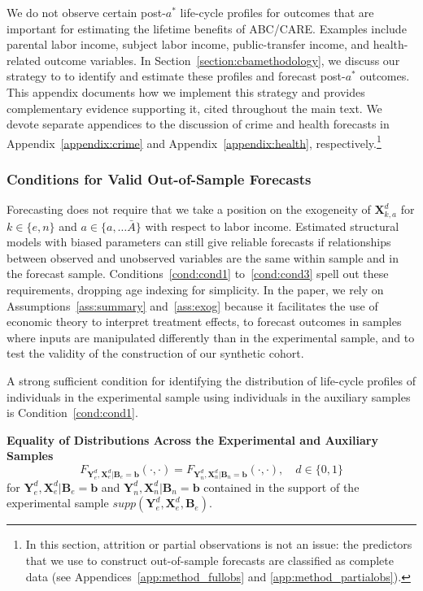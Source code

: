 \noindent We do not observe certain post-$a^*$ life-cycle profiles for outcomes that are important for estimating the lifetime benefits of ABC/CARE. Examples include parental labor income, subject labor income, public-transfer income, and health-related outcome variables. In Section~\ref{section:cbamethodology}, we discuss our strategy to to identify and estimate these profiles and forecast post-$a^\ast$ outcomes. This appendix documents how we implement this strategy and provides complementary evidence supporting it, cited throughout the main text. We devote separate appendices to the discussion of crime and health forecasts in Appendix~\ref{appendix:crime} and Appendix~\ref{appendix:health}, respectively.\footnote{In this section, attrition or partial observations is not an issue: the predictors that we use to construct out-of-sample forecasts are classified as complete data (see Appendices~\ref{app:method_fullobs} and \ref{app:method_partialobs}).}

\subsubsection{Conditions for Valid Out-of-Sample Forecasts}

Forecasting does not require that we take a position on the exogeneity of $\bm{X}^d_{k,a}$ for $k \in \{e,n\}$ and $a \in \{ a, \ldots \bar{A} \}$ with respect to labor income. Estimated structural models with biased parameters can still give reliable forecasts if relationships between observed and unobserved variables are the same within sample and in the forecast sample. Conditions~\ref{cond:cond1} to~\ref{cond:cond3} spell out these requirements, dropping age indexing for simplicity. In the paper, we rely on Assumptions~\ref{ass:summary} and~\ref{ass:exog} because it facilitates the use of economic theory to interpret treatment effects, to forecast outcomes in samples where inputs are manipulated differently than in the experimental sample, and to test the validity of the construction of our synthetic cohort.

\noindent A strong sufficient condition for identifying the distribution of life-cycle profiles of individuals in the experimental sample using individuals in the auxiliary samples is Condition~\ref{cond:cond1}.

\onehalfspacing
\begin{condition} \textbf{Equality of Distributions Across the Experimental and Auxiliary Samples \label{cond:cond1}}
\begin{equation}
F_{\bm{Y}_e^d, \bm{X}_e^d | \bm{B}_e = \bm{b}} \left( \cdot, \cdot \right) = F_{\bm{Y}_n^d, \bm{X}_n^d | \bm{B}_n = \bm{b}} \left( \cdot, \cdot \right), \quad d \in \{0,1\}
\end{equation}
\noindent for $\bm{Y}_e^d, \bm{X}^d_e | \bm{B}_e = \bm{b}$ and $\bm{Y}_n^d, \bm{X}^d_n | \bm{B}_n = \bm{b}$ contained in the support of the experimental sample $supp\left(\bm{Y}^d_{e}, \bm{X}^d_{e}, \bm{B}_{e} \right)$.
\end{condition}
\doublespacing

